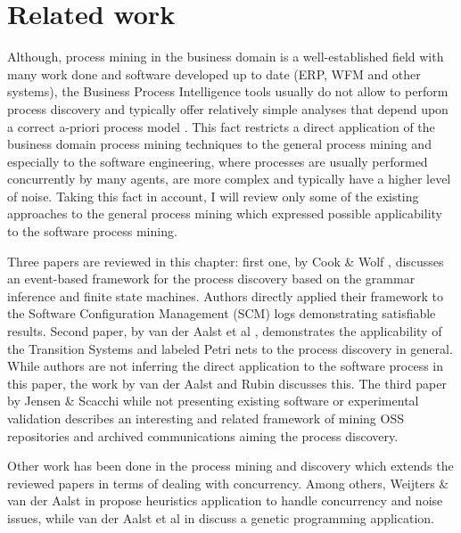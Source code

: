 \chapter{Related work} \label{related.work}
Although, process mining in the business domain is a well-established field with many work done and software developed up to date (ERP, WFM and other systems), the Business Process Intelligence tools usually do not allow to perform process discovery and typically offer relatively simple analyses that depend upon a correct a-priori process model \cite{citeulike:3718014} \cite{citeulike:5044991}. This fact restricts a direct application of the business domain process mining techniques to the general process mining and especially to the software engineering, where processes are usually performed concurrently by many agents, are more complex and typically have a higher level of noise. Taking this fact in account, I will review only some of the existing approaches to the general process mining which expressed possible applicability to the software process mining. 

Three papers are reviewed in this chapter: first one, by Cook \& Wolf \cite{citeulike:328044}, discusses an event-based framework for the process discovery based on the grammar inference and finite state machines. Authors directly applied their framework to the Software Configuration Management (SCM) logs demonstrating satisfiable results. Second paper, by van der Aalst et al \cite{citeulike:3718014}, demonstrates the applicability of the Transition Systems and labeled Petri nets to the process discovery in general. While authors are not inferring the direct application to the software process in this paper, the work by van der Aalst and Rubin \cite{citeulike:1885717} discusses this. The third paper by Jensen \& Scacchi while not presenting existing software or experimental validation describes an interesting and related framework of mining OSS repositories and archived communications aiming the process discovery. 

Other work has been done in the process mining and discovery which extends the reviewed papers in terms of dealing with concurrency. Among others, Weijters \& van der Aalst in \cite{citeulike:5128101} propose heuristics application to handle concurrency and noise issues, while van der Aalst et al in \cite{citeulike:5128101} discuss a genetic programming application.